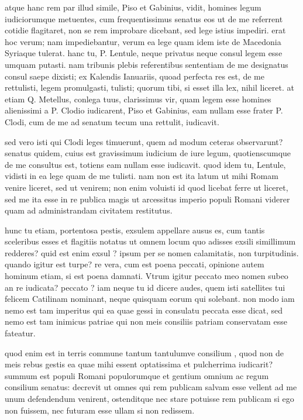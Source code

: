  atque hanc rem par illud simile, Piso et Gabinius, vidit, homines legum iudiciorumque metuentes, cum frequentissimus senatus eos ut de me referrent cotidie flagitaret, non se rem improbare dicebant, sed lege istius impediri. erat hoc verum; nam impediebantur, verum ea lege quam idem iste de Macedonia Syriaque tulerat. hanc tu, P. Lentule, neque privatus neque consul legem esse umquam putasti. nam tribunis plebis referentibus sententiam de me designatus consul saepe dixisti; ex Kalendis Ianuariis, quoad perfecta res est, de me rettulisti, legem promulgasti, tulisti; quorum tibi, si esset illa lex, nihil liceret. at etiam Q. Metellus, conlega tuus, clarissimus vir, quam legem esse homines alienissimi a P. Clodio iudicarent, Piso et Gabinius, eam nullam esse frater P. Clodi, cum de me ad senatum tecum una rettulit, iudicavit.

 sed vero isti qui Clodi leges timuerunt, quem ad modum ceteras observarunt? senatus quidem, cuius est gravissimum iudicium de iure legum, quotienscumque de me consultus est, totiens eam nullam esse iudicavit. quod idem tu, Lentule, vidisti in ea lege quam de me tulisti. nam non est ita latum ut mihi Romam venire liceret, sed ut venirem; non enim voluisti id quod licebat ferre ut liceret, sed me ita esse in re publica magis ut arcessitus imperio populi Romani viderer quam ad administrandam civitatem restitutus.

 hunc tu etiam, portentosa pestis, exsulem appellare ausus es, cum tantis sceleribus esses et flagitiis notatus ut omnem locum quo adisses exsili simillimum redderes? quid est enim exsul ? ipsum per se nomen calamitatis, non turpitudinis. quando igitur est turpe? re vera, cum est poena peccati, opinione autem hominum etiam, si est poena damnati. Vtrum igitur peccato meo nomen subeo an re iudicata? peccato ? iam neque tu id dicere audes, quem isti satellites tui felicem Catilinam nominant, neque quisquam eorum qui solebant. non modo iam nemo est tam imperitus qui ea quae gessi in consulatu peccata esse dicat, sed nemo est tam inimicus patriae qui non meis consiliis patriam conservatam esse fateatur.

 quod enim est in terris commune tantum tantulumve consilium , quod non de meis rebus gestis ea quae mihi essent optatissima et pulcherrima iudicarit? summum est populi Romani populorumque et gentium omnium ac regum consilium senatus: decrevit ut omnes qui rem publicam salvam esse vellent ad me unum defendendum venirent, ostenditque nec stare potuisse rem publicam si ego non fuissem, nec futuram esse ullam si non redissem.

